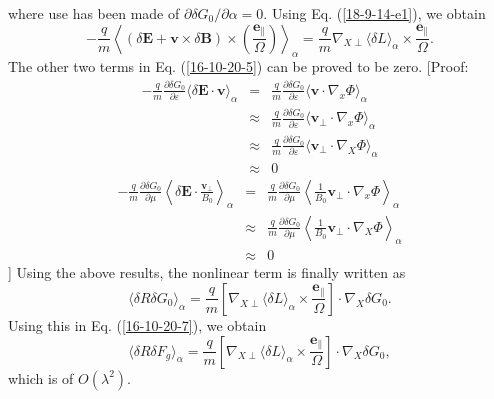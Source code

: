 \documentclass{llncs}
\newcommand{\tmmathbf}[1]{\ensuremath{\boldsymbol{#1}}}
\begin{document}
where use has been made of $\partial \delta G_0 / \partial \alpha = 0$. Using
Eq. (\ref{18-9-14-e1}), we obtain
\begin{equation}
  - \frac{q}{m} \left\langle (\delta \mathbf{E}+\mathbf{v} \times \delta
  \mathbf{B}) \times \left( \frac{\tmmathbf{e}_{\parallel}}{\Omega}  \right)
  \right\rangle_{\alpha} = \frac{q}{m} \nabla_{X \perp} \langle \delta L
  \rangle_{\alpha} \times \frac{\tmmathbf{e}_{\parallel}}{\Omega} .
\end{equation}
The other two terms in Eq. (\ref{16-10-20-5}) can be proved to be zero.
[Proof:
\begin{eqnarray}
  - \frac{q}{m}  \frac{\partial \delta G_0}{\partial \varepsilon} \langle
  \delta \mathbf{E} \cdot \mathbf{v} \rangle_{\alpha} & = & \frac{q}{m} 
  \frac{\partial \delta G_0}{\partial \varepsilon} \langle \mathbf{v} \cdot
  \nabla_x \Phi \rangle_{\alpha} \nonumber\\
  & \approx & \frac{q}{m}  \frac{\partial \delta G_0}{\partial \varepsilon}
  \langle \mathbf{v}_{\perp} \cdot \nabla_x \Phi \rangle_{\alpha} \nonumber\\
  & \approx & \frac{q}{m}  \frac{\partial \delta G_0}{\partial \varepsilon}
  \langle \mathbf{v}_{\perp} \cdot \nabla_X \Phi \rangle_{\alpha} \nonumber\\
  & \approx & 0 
\end{eqnarray}
\begin{eqnarray}
  - \frac{q}{m}  \frac{\partial \delta G_0}{\partial \mu} \left\langle \delta
  \mathbf{E} \cdot \frac{\mathbf{v}_{\perp}}{B_0} \right\rangle_{\alpha} & = &
  \frac{q}{m}  \frac{\partial \delta G_0}{\partial \mu} \left\langle
  \frac{1}{B_0} \mathbf{v}_{\perp} \cdot \nabla_x \Phi \right\rangle_{\alpha}
  \nonumber\\
  & \approx & \frac{q}{m}  \frac{\partial \delta G_0}{\partial \mu}
  \left\langle \frac{1}{B_0} \mathbf{v}_{\perp} \cdot \nabla_X \Phi
  \right\rangle_{\alpha} \nonumber\\
  & \approx & 0 
\end{eqnarray}
] Using the above results, the nonlinear term is finally written as
\begin{equation}
  \langle \delta R \delta G_0 \rangle_{\alpha} = \frac{q}{m} \left[ \nabla_{X
  \perp} \langle \delta L \rangle_{\alpha} \times
  \frac{\tmmathbf{e}_{\parallel}}{\Omega} \right] \cdot \nabla_X \delta G_0 .
\end{equation}
Using this in Eq. (\ref{16-10-20-7}), we obtain
\begin{equation}
  \langle \delta R \delta F_g \rangle_{\alpha} = \frac{q}{m} \left[ \nabla_{X
  \perp} \langle \delta L \rangle_{\alpha} \times
  \frac{\tmmathbf{e}_{\parallel}}{\Omega} \right] \cdot \nabla_X \delta G_0,
\end{equation}
which is of $O (\lambda^2)$.
\end{document}
